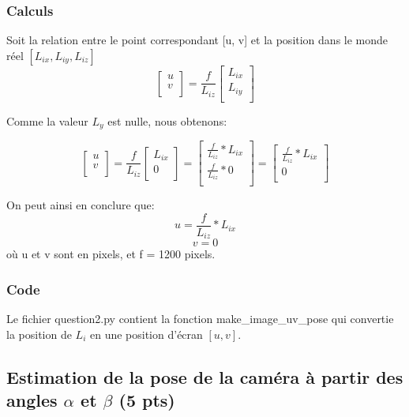 \documentclass[12pt]{article}
\begin{document}
\subsubsection{Calculs}
Soit la relation entre le point correspondant [u, v] et la position dans le monde r\'eel $ [L_{ix}, L_{iy}, L_{iz}] $
\[ \left[ {\begin{array}{c}
                u \\
    v \\ \end{array} } \right] =
    \frac{f}{L_{iz}}
    \left[ {\begin{array}{c} L_{ix} \\ L_{iy} \\ \end{array}} \right]
\]

Comme la valeur $L_y$ est nulle, nous obtenons:


\[ \left[ {\begin{array}{c}
                u \\
    v \\ \end{array} } \right] =
    \frac{f}{L_{iz}}
    \left[ {\begin{array}{c} L_{ix} \\ 0 \\ \end{array}} \right]
=
    \left[ {\begin{array}{c} \frac{f}{L_{iz}} * L_{ix} \\ \frac{f}{L_{iz}} * 0 \\ \end{array}} \right]
=
    \left[ {\begin{array}{c} \frac{f}{L_{iz}} * L_{ix} \\ 0 \\ \end{array}} \right]

\]

On peut ainsi en conclure que:
\[
    u =  \frac{f}{L_{iz}} * L_{ix}
\]
\[
    v = 0
\]
o\`u u et v sont en pixels, et f = 1200 pixels.

\subsubsection{Code}

Le fichier question2.py contient la fonction make\_image\_uv\_pose qui convertie la position de $L_i$ en une position d'écran $ [u, v] $.

\subsection{Estimation de la pose de la caméra à partir des angles $\alpha$ et $\beta$ (5 pts)}
\end{document}
